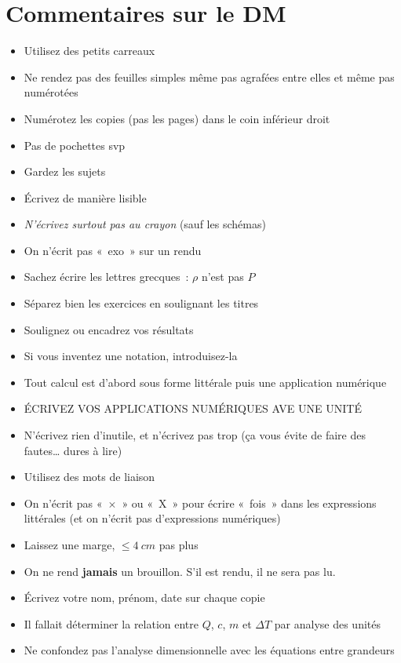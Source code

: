 \documentclass[a4paper, 12pt, final, garamond]{book}
\begin{document}
\setcounter{chapter}{-1}

\chapter{Commentaires sur le DM}

\begin{itemize}
    \item Utilisez des petits carreaux
    \item Ne rendez pas des feuilles simples même pas agrafées entre elles et
        même pas numérotées
    \item Numérotez les copies (pas les pages) dans le coin inférieur droit
    \item Pas de pochettes svp
    \item Gardez les sujets
    \item Écrivez de manière lisible
    \item \textit{N'écrivez surtout pas au crayon} (sauf les schémas)
    \item On n'écrit pas «~exo~» sur un rendu
    \item Sachez écrire les lettres grecques~: $\rho$ n'est pas $P$
    \item Séparez bien les exercices en soulignant les titres
    \item Soulignez ou encadrez vos résultats
    \item Si vous inventez une notation, introduisez-la
    \item Tout calcul est d'abord sous forme littérale puis une application
        numérique
    \item ÉCRIVEZ VOS APPLICATIONS NUMÉRIQUES AVE UNE UNITÉ
    \item N'écrivez rien d'inutile, et n'écrivez pas trop (ça vous évite de
        faire des fautes… dures à lire)
    \item Utilisez des mots de liaison
    \item On n'écrit pas «~$\times$~» ou «~X~» pour écrire «~fois~» dans les
        expressions littérales (et on n'écrit pas d'expressions numériques)
    \item Laissez une marge, $\leq \SI{4}{cm}$ pas plus
    \item On ne rend \textbf{jamais} un brouillon. S'il est rendu, il ne sera
        pas lu.
    \item Écrivez votre nom, prénom, date sur chaque copie
    \item Il fallait déterminer la relation entre $Q$, $c$, $m$ et $\Delta T$
        par analyse des unités
    \item Ne confondez pas l'analyse dimensionnelle avec les équations entre
        grandeurs
\end{itemize}
\end{document}
